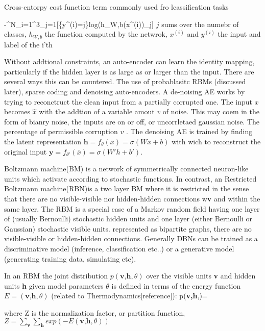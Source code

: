 Cross-entorpy cost function term  commonly used fro lcassification tasks\citep{glorot2010understanding}

\be
-\sum^N_{i=1}\sum^3_{j=1}[\{y^(i)=j\}log(h_{W,b}(x^{(i)})_j]
\ee
$j$ sums over the numebr of classes, $h_{W,b}$ the function computed by the netwrok, $x^{(i)}$ and $y^{(i)}$ the input and label of the i'th  



Without addtional constraints, an auto-encoder can learn the identity mapping, particularly if the hidden layer is as large as or larger than the input.
There are several ways this can be countered.
The use of probablasitc RBMs (discussed later), sparse coding and denoising auto-encoders.
A de-noising AE works by trying to reconctruct the clean input from a partially corrupted one.
The input $x$ becomes $\overbrace{x}$ with the addtion of a variable amout $v$ of noise.
This may coem in the form of bianry noise, the inputs are on or off, or uncorrletaed gaussian noise.
The percentage of permissible corruption $v$ .
The denoising AE is trained by finding the latent representation $\textbf{h} = f_\theta(\bar{x}) = \sigma(W\bar{x}+b)$ with wich to reconstruct the original input  $\textbf{y} = f_{\theta'}(\bar{x})=\sigma(W'h+b')$.

Boltzmann machine(BM) is a network of symmetrically connected neuron-like units which activate according to stochastic functions.
In contrast, an Restricted Boltzmann machine(RBN)is a two layer BM where it is restricted in the sense that there are no visible-visible nor hidden-hidden connections w\textbf{v} and within the same layer.
The RBM is a special case of a Markov random field having one layer of (usually Bernoulli) stochastic hidden units and one layer (either Bernoulli or Gaussian) stochastic visible units.
represented as bipartite graphs, there are no visible-visible or hidden-hidden connections.
Generally DBNs can be trained as a discriminative model (inference, classification etc..) or a generative model (generating training data, simulating etc)\citep{mo2012survey}.

In an RBM the joint distribution $p(\textbf{v,h},\theta)$ over the visible units \textbf{v} and hidden units \textbf{h} given model parameters $\theta$ is defined in terms of the energy function $E=(\textbf{v,h},\theta)$ (related to Thermodynamics[reference])\citep{dengthree}:
\be
p(\textbf{v,h},\theta)= 
\ee

where Z is the normalization factor, or partition function, $Z=\sum_\textbf{v} \sum_\textbf{h} exp(-E(\textbf{v,h},\theta))$

